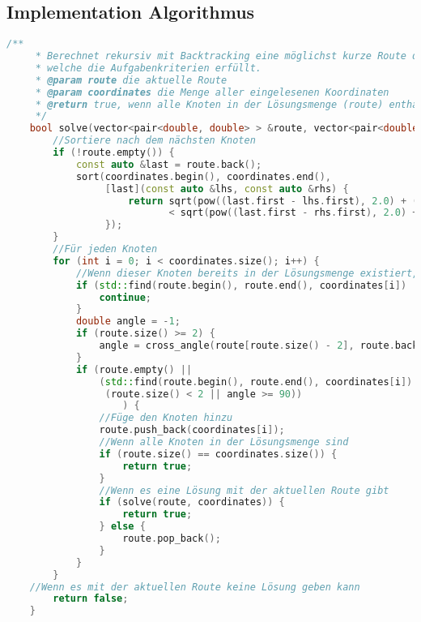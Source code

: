 \documentclass[a4paper,10pt,ngerman]{scrartcl}
\begin{document}
    \newpage
    \subsection{Implementation Algorithmus}\label{subsec:implementation-algorithmus}
    \begin{lstlisting}[frame=single,language=C++,title=Methode solve,breaklines=true,label={lst:code_solve}]
    /**
     * Berechnet rekursiv mit Backtracking eine möglichst kurze Route durch den Graphen,
     * welche die Aufgabenkriterien erfüllt.
     * @param route die aktuelle Route
     * @param coordinates die Menge aller eingelesenen Koordinaten
     * @return true, wenn alle Knoten in der Lösungsmenge (route) enthalten sind, andernfalls false
     */
    bool solve(vector<pair<double, double> > &route, vector<pair<double, double> > &coordinates) {
        //Sortiere nach dem nächsten Knoten
        if (!route.empty()) {
            const auto &last = route.back();
            sort(coordinates.begin(), coordinates.end(),
                 [last](const auto &lhs, const auto &rhs) {
                     return sqrt(pow((last.first - lhs.first), 2.0) + (pow((last.second - lhs.second), 2.0)))
                            < sqrt(pow((last.first - rhs.first), 2.0) + (pow((last.second - rhs.second), 2.0)));
                 });
        }
        //Für jeden Knoten
        for (int i = 0; i < coordinates.size(); i++) {
            //Wenn dieser Knoten bereits in der Lösungsmenge existiert, überspringe diesen
            if (std::find(route.begin(), route.end(), coordinates[i]) != route.end()) {
                continue;
            }
            double angle = -1;
            if (route.size() >= 2) {
                angle = cross_angle(route[route.size() - 2], route.back(), coordinates[i]);
            }
            if (route.empty() ||
                (std::find(route.begin(), route.end(), coordinates[i]) == route.end() &&
                 (route.size() < 2 || angle >= 90))
                    ) {
                //Füge den Knoten hinzu
                route.push_back(coordinates[i]);
                //Wenn alle Knoten in der Lösungsmenge sind
                if (route.size() == coordinates.size()) {
                    return true;
                }
                //Wenn es eine Lösung mit der aktuellen Route gibt
                if (solve(route, coordinates)) {
                    return true;
                } else {
                    route.pop_back();
                }
            }
        }
    //Wenn es mit der aktuellen Route keine Lösung geben kann
        return false;
    }
    \end{lstlisting}
\end{document}
